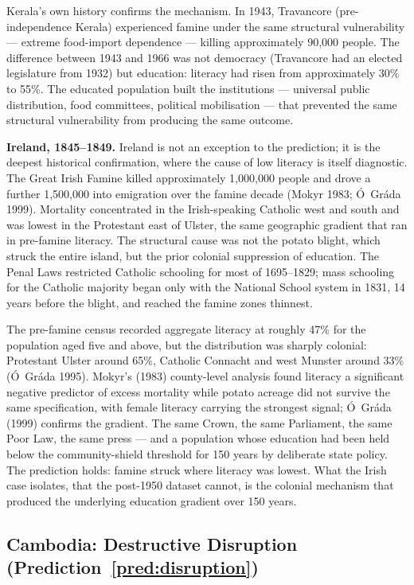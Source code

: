 \documentclass[12pt,letterpaper]{article}
\begin{document}
Kerala's own history confirms the mechanism. In 1943, Travancore (pre-independence Kerala) experienced famine under the same structural vulnerability --- extreme food-import dependence --- killing approximately 90,000 people. The difference between 1943 and 1966 was not democracy (Travancore had an elected legislature from 1932) but education: literacy had risen from approximately 30\% to 55\%. The educated population built the institutions --- universal public distribution, food committees, political mobilisation --- that prevented the same structural vulnerability from producing the same outcome.

\textbf{Ireland, 1845--1849.} Ireland is not an exception to the
prediction; it is the deepest historical confirmation, where the
cause of low literacy is itself diagnostic. The Great Irish Famine
killed approximately 1,000,000 people and drove a further 1,500,000
into emigration over the famine decade (Mokyr 1983;
Ó~Gráda 1999). Mortality concentrated in the Irish-speaking Catholic
west and south and was lowest in the Protestant east of Ulster, the
same geographic gradient that ran in pre-famine literacy. The
structural cause was not the potato blight, which struck the entire
island, but the prior colonial suppression of education. The Penal
Laws restricted Catholic schooling for most of 1695--1829; mass
schooling for the Catholic majority began only with the National
School system in 1831, 14 years before the blight, and reached
the famine zones thinnest.

The pre-famine census recorded aggregate
literacy at roughly 47\% for the population aged five and above, but
the distribution was sharply colonial: Protestant Ulster around 65\%,
Catholic Connacht and west Munster around 33\% (Ó~Gráda 1995). Mokyr's
(1983) county-level analysis found literacy a significant negative
predictor of excess mortality while potato acreage did not survive
the same specification, with female literacy carrying the strongest
signal; Ó~Gráda (1999) confirms the gradient. The same Crown, the same
Parliament, the same Poor Law, the same press --- and a population
whose education had been held below the community-shield threshold for
150 years by deliberate state policy. The prediction holds: famine
struck where literacy was lowest. What the Irish case isolates, that
the post-1950 dataset cannot, is the colonial mechanism that produced
the underlying education gradient over 150 years.

\subsection{Cambodia: Destructive Disruption (Prediction~\ref{pred:disruption})}\label{cambodia-the-home-niche-shadow}
\end{document}
